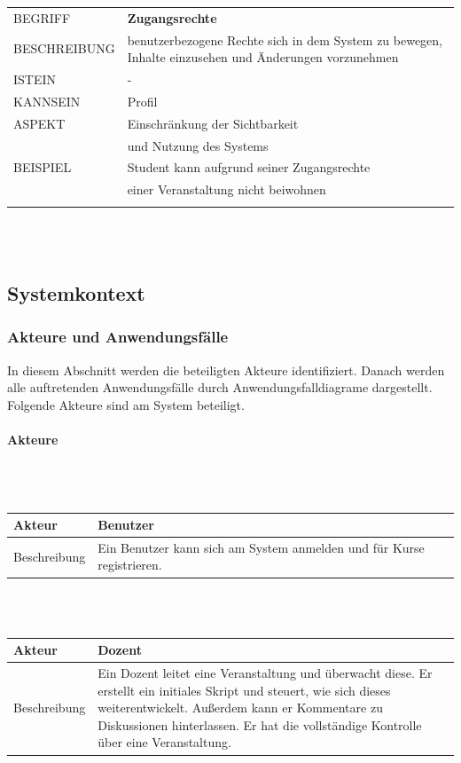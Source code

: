 \documentclass[12pt,a4paper]{article}
\begin{document}
\begin{tabular}{l p{12cm}}
BEGRIFF 	 & \textbf{Zugangsrechte} \\ 
BESCHREIBUNG & benutzerbezogene Rechte sich in dem System zu bewegen, Inhalte einzusehen und Änderungen vorzunehmen \\ 
ISTEIN   	 & - \\
KANNSEIN 	 & Profil\\ 
ASPEKT   	 & Einschränkung der Sichtbarkeit\\
			 & und Nutzung des Systems \\
BEISPIEL 	 & Student kann aufgrund seiner Zugangsrechte\\
			 & einer Veranstaltung nicht beiwohnen\\\\
\hline
\end{tabular}\\\\ 
\newpage

\subsection{Systemkontext}
\subsubsection{Akteure und Anwendungsfälle}
In diesem Abschnitt werden die beteiligten Akteure identifiziert. Danach werden alle auftretenden Anwendungsfälle durch Anwendungsfalldiagrame dargestellt.
Folgende Akteure sind am System beteiligt.\\
\paragraph{Akteure}
\mbox{}\\\\
\begin{tabular}{l p{12cm}}
Akteur & \textbf{Benutzer} \\ 
\hline Beschreibung & Ein Benutzer kann sich am System anmelden und für Kurse registrieren. \\ 
\end{tabular}\\\\

\begin{tabular}{l p{12cm}}
Akteur & \textbf{Dozent} \\ 
\hline 
Beschreibung 	& Ein Dozent leitet eine Veranstaltung und überwacht diese. Er erstellt ein initiales Skript und steuert, wie sich dieses weiterentwickelt. Außerdem kann er Kommentare zu Diskussionen hinterlassen. Er hat die vollständige Kontrolle über eine Veranstaltung.\\ 
\end{tabular}\\\\
\end{document}
